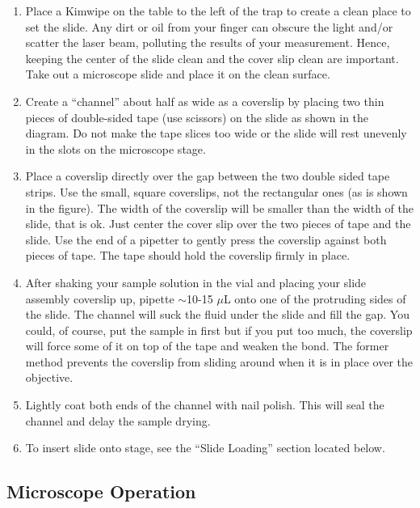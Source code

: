 \documentclass{../lab}
\begin{document}
\begin{enumerate}
    \item Place a Kimwipe on the table to the left of the trap to create a clean place to set the slide. Any dirt or oil from your finger can obscure the light and/or scatter the laser beam, polluting the results of your measurement. Hence, keeping the center of the slide clean and the cover slip clean are important. Take out a microscope slide and place it on the clean surface.

    \item Create a ``channel'' about half as wide as a coverslip by placing two thin pieces of double-sided tape (use scissors) on the slide as shown in the diagram. Do not make the tape slices too wide or the slide will rest unevenly in the slots on the microscope stage.

    \item Place a coverslip directly over the gap between the two double sided tape strips. Use the small, square coverslips, not the rectangular ones (as is shown in the figure). The width of the coverslip will be smaller than the width of the slide, that is ok. Just center the cover slip over the two pieces of tape and the slide. Use the end of a pipetter to gently press the coverslip against both pieces of tape. The tape should hold the coverslip firmly in place.

    \item After shaking your sample solution in the vial and placing your slide assembly coverslip up, pipette $\sim$10-15 $\mu$L onto one of the protruding sides of the slide. The channel will suck the fluid under the slide and fill the gap. You could, of course, put the sample in first but if you put too much, the coverslip will force some of it on top of the tape and weaken the bond. The former method prevents the coverslip from sliding around when it is in place over the objective.

    \item Lightly coat both ends of the channel with nail polish. This will seal the channel and delay the sample drying.

    \item To insert slide onto stage, see the ``Slide Loading'' section located below.
\end{enumerate}

\subsection{Microscope Operation}
\end{document}
